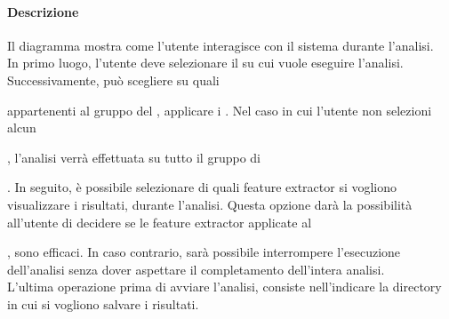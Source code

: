 \paragraph{Descrizione\\}
Il diagramma mostra come l'utente interagisce con il sistema durante l'analisi. 
\\In primo luogo, l'utente deve selezionare il \dataset{} su cui vuole eseguire l'analisi. Successivamente, può scegliere su quali \subject{} appartenenti al gruppo del \dataset{}, applicare i \protocol{}. Nel caso in cui l'utente non selezioni alcun \subject{}, l'analisi verrà effettuata su tutto il gruppo di \subject{}. In seguito, è possibile selezionare di quali feature extractor\glossario{} si vogliono visualizzare i risultati, durante l'analisi. Questa opzione darà la possibilità all'utente di decidere se le feature extractor\glossario{} applicate al \subject{}, sono efficaci. In caso contrario, sarà possibile interrompere l'esecuzione dell'analisi senza dover aspettare il completamento dell'intera analisi.
\\L'ultima operazione prima di avviare l'analisi, consiste nell'indicare la directory in cui si vogliono salvare i risultati.

